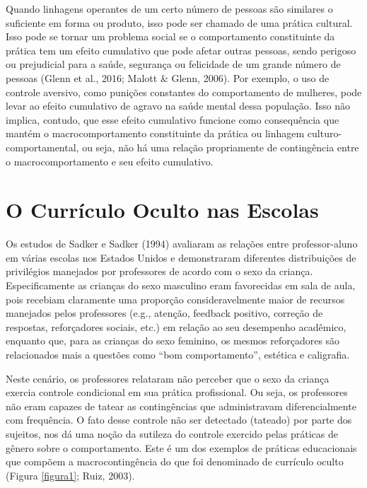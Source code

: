 Quando linhagens operantes de um certo número de pessoas são similares o suficiente em forma ou produto, isso pode ser chamado de uma prática cultural. Isso pode se tornar um problema social se o comportamento constituinte da prática tem um efeito cumulativo que pode afetar outras pessoas, sendo perigoso ou prejudicial para a saúde, segurança ou felicidade de um grande número de pessoas (Glenn et al., 2016; Malott \& Glenn, 2006). Por exemplo, o uso de controle aversivo, como punições constantes do comportamento de mulheres, pode levar ao efeito cumulativo de agravo na saúde mental dessa população. Isso não implica, contudo, que esse efeito cumulativo funcione como consequência que mantém o macrocomportamento constituinte da prática ou linhagem culturo-comportamental, ou seja, não há uma relação propriamente de contingência entre o macrocomportamento e seu efeito cumulativo.

\section*{O Currículo Oculto nas Escolas}

Os estudos de Sadker e Sadker (1994) avaliaram as relações entre professor-aluno em várias escolas nos Estados Unidos e demonstraram diferentes distribuições de privilégios manejados por professores de acordo com o sexo da criança. Especificamente as crianças do sexo masculino eram favorecidas em sala de aula, pois recebiam claramente uma proporção consideravelmente maior de recursos manejados pelos professores (e.g., atenção, feedback positivo, correção de respostas, reforçadores sociais, etc.) em relação ao seu desempenho acadêmico, enquanto que, para as crianças do sexo feminino, os mesmos reforçadores são relacionados mais a questões como “bom comportamento”, estética e caligrafia.

Neste cenário, os professores relataram não perceber que o sexo da criança exercia controle condicional em sua prática profissional. Ou seja, os professores não eram capazes de tatear as contingências que administravam diferencialmente com frequência. O fato desse controle não ser detectado (tateado) por parte dos sujeitos, nos dá uma noção da sutileza do controle exercido pelas práticas de gênero sobre o comportamento. Este é um dos exemplos de práticas educacionais que compõem a macrocontingência do que foi denominado de currículo oculto (Figura \ref{figura1}; Ruiz, 2003).

